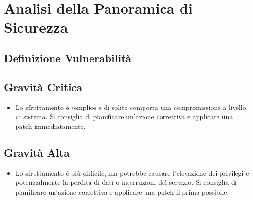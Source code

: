 \chapter{Analisi della Panoramica di Sicurezza}


\begin{center}
\vspace{0cm}
\end{center}

\section{Definizione Vulnerabilità}
\section{Gravità Critica}
\begin{itemize}
\item Lo sfruttamento è semplice e di solito comporta una compromissione a livello di sistema. Si consiglia di pianificare un'azione correttiva e applicare una patch immediatamente.
\end{itemize}
\section{Gravità Alta}
\begin{itemize}
\item Lo sfruttamento è più difficile, ma potrebbe causare l'elevazione dei privilegi e potenzialmente la perdita di dati o interruzioni del servizio. Si consiglia di pianificare un'azione correttiva e applicare una patch il prima possibile.
\end{itemize}
